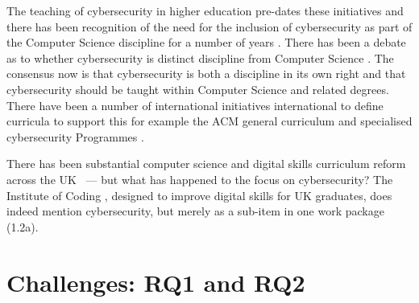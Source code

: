 \documentclass[conference]{IEEEtran}
\begin{document}
The teaching of cybersecurity in higher education pre-dates these initiatives and there has been recognition of the need for the inclusion of cybersecurity as part of the Computer Science discipline for a number of years \cite{Hentea2006}. There has  been a debate as to whether cybersecurity is distinct discipline from Computer Science \cite{McGettrick2013}. The consensus now is that cybersecurity is both a discipline in its own right and that cybersecurity should be taught within Computer Science and related degrees. There have been a number of international initiatives international to define curricula to support this for example the ACM general curriculum  \cite[which added ``Information Assurance and Security'' for the first time]{ACM2013a} and specialised cybersecurity Programmes \cite{ACMIEEEAISSIGSECIFIP}.


There has been substantial computer science and digital skills curriculum reform across the UK~\cite{brown-et-al:toce2014,moller+crick:jce2018} --- but what has happened to the focus on cybersecurity? The Institute of Coding \cite{Davenportetal2019a}, designed to improve digital skills for UK graduates, does indeed mention cybersecurity, but merely as a sub-item in one work package (1.2a).



\section{Challenges: RQ1 and RQ2}
\end{document}
